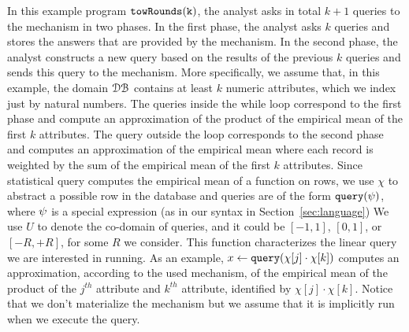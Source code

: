 \begin{example}[twoRounds]
   In this example program $\mathtt{towRounds(k)}$, the analyst asks in total $k+1$ queries to the mechanism in two phases.
   In the first phase, the analyst asks $k$ queries and stores the answers that are provided by the mechanism. 
   In the second phase, the analyst constructs a new query based on the results of the previous $k$ queries and sends this query to the mechanism. More specifically, we assume that, in this example, the domain $\mathcal{DB}$ 
   contains at least $k$ numeric attributes, which we index just by natural numbers. 
   The queries inside the while loop correspond to the first phase and compute an approximation of 
   the product of the empirical mean of the first $k$ attributes. 
   The query outside the loop corresponds to the second phase and computes an approximation of the empirical mean where each record is weighted by the sum of the empirical mean of the first $k$ attributes.
   {Since statistical query computes the empirical mean of a function on rows, we use $\chi$ to abstract a possible row in the database and }
   queries are of the form ${\tt query}(\psi)$, where $\psi$ is a special expression 
   (as in our syntax in Section~\ref{sec:language})
   {
   We use $U$ to denote the co-domain of queries, and it could be $[-1,1]$, $[0,1]$, or $[-R,+R]$, for some $R$ we consider.
   This function characterizes the linear query we are interested in running. 
   As an example, $x \leftarrow {\tt query}(\chi[j] \cdot \chi[k])$ computes an approximation, according to the used mechanism, of the empirical mean of the product of the $j^{th}$ attribute and $k^{th}$ attribute, identified by $\chi[j] \cdot \chi[k]$. Notice that we don't materialize the mechanism but we assume that it is implicitly run when we execute the query. } 
  

\end{example}
